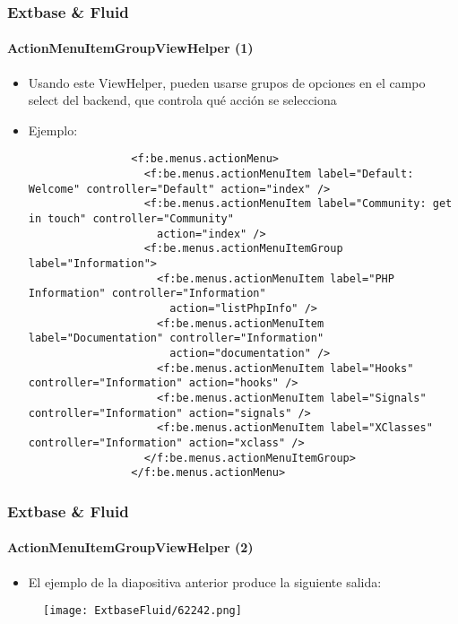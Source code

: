 \begin{frame}[fragile]
	\frametitle{Extbase \& Fluid}
	\framesubtitle{ActionMenuItemGroupViewHelper (1)}

	\lstset{basicstyle=\tiny\ttfamily}

	\begin{itemize}

		\item Usando este ViewHelper, pueden usarse grupos de opciones en el campo select del backend,
			que controla qué acción se selecciona

		\item Ejemplo:
			\begin{lstlisting}
				<f:be.menus.actionMenu>
				  <f:be.menus.actionMenuItem label="Default: Welcome" controller="Default" action="index" />
				  <f:be.menus.actionMenuItem label="Community: get in touch" controller="Community"
				    action="index" />
				  <f:be.menus.actionMenuItemGroup label="Information">
				    <f:be.menus.actionMenuItem label="PHP Information" controller="Information"
				      action="listPhpInfo" />
				    <f:be.menus.actionMenuItem label="Documentation" controller="Information"
				      action="documentation" />
				    <f:be.menus.actionMenuItem label="Hooks" controller="Information" action="hooks" />
				    <f:be.menus.actionMenuItem label="Signals" controller="Information" action="signals" />
				    <f:be.menus.actionMenuItem label="XClasses" controller="Information" action="xclass" />
				  </f:be.menus.actionMenuItemGroup>
				</f:be.menus.actionMenu>
			\end{lstlisting}

	\end{itemize}

\end{frame}


\begin{frame}[fragile]
	\frametitle{Extbase \& Fluid}
	\framesubtitle{ActionMenuItemGroupViewHelper (2)}

	\begin{itemize}
		\item El ejemplo de la diapositiva anterior produce la siguiente salida:
	\end{itemize}

	\begin{figure}
		\texttt{[image: ExtbaseFluid/62242.png]}
	\end{figure}

\end{frame}

